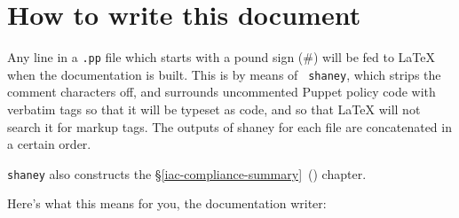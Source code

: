 \section{How to write this document}
\label{writing}

Any line in a {\tt *.pp} file which starts with a pound sign (\#) will be
fed to {\LaTeX} when the documentation is built. This is by means of {\tt
shaney}, which strips the comment characters off, and surrounds uncommented
Puppet policy code with verbatim tags so that it will be typeset as code,
and so that {\LaTeX} will not search it for markup tags. The outputs of
shaney for each file are concatenated in a certain order.

{\tt shaney} also constructs the
\S\ref{iac-compliance-summary}~() chapter.

Here's what this means for you, the documentation writer:

